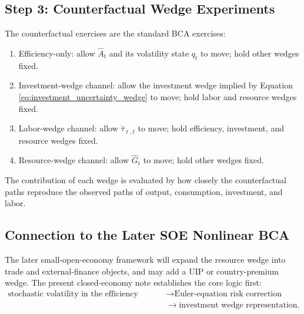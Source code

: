 \subsection{Step 3: Counterfactual Wedge Experiments}

The counterfactual exercises are the standard BCA exercises:
\begin{enumerate}[label=(\alph*)]
    \item Efficiency-only: allow \(\widehat{A}_t\) and its volatility state
    \(q_t\) to move; hold other wedges fixed.
    \item Investment-wedge channel: allow the investment wedge implied by
    Equation \eqref{eq:investment_uncertainty_wedge} to move; hold labor and
    resource wedges fixed.
    \item Labor-wedge channel: allow \(\widehat{\tau}_{\ell,t}\) to move; hold
    efficiency, investment, and resource wedges fixed.
    \item Resource-wedge channel: allow \(\widehat{G}_t\) to move; hold other
    wedges fixed.
\end{enumerate}
The contribution of each wedge is evaluated by how closely the counterfactual
paths reproduce the observed paths of output, consumption, investment, and
labor.

\subsection{Connection to the Later SOE Nonlinear BCA}

The later small-open-economy framework will expand the resource wedge into
trade and external-finance objects, and may add a UIP or country-premium wedge.
The present closed-economy note establishes the core logic first:
\[
    \begin{aligned}
    \text{stochastic volatility in the efficiency wedge}
    &\rightarrow
    \text{Euler-equation risk correction}
    \\
    &\rightarrow
    \text{investment wedge representation}.
    \end{aligned}
\]
